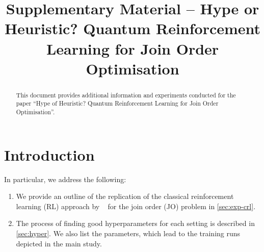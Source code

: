 \documentclass[10pt, conference]{IEEEtran}
\begin{document}
\title{Supplementary Material -- Hype or Heuristic? Quantum Reinforcement Learning for Join Order Optimisation}

\author{
\and
{}
\and
{}
\and
{}
}

\maketitle

\begin{abstract}
  This document provides additional information and experiments conducted for the paper \enquote{Hype of Heuristic? Quantum Reinforcement Learning for Join Order Optimisation}.
\end{abstract}

\section{Introduction}
\label{sec:intro}
In particular, we address the following:
\begin{enumerate}
  \item We provide an outline of the replication of the classical reinforcement learning (RL) approach by \mapa~\cite{marcus18} for the join order (JO) problem in \autoref{sec:exp-crl}.
  \item The process of finding good hyperparameters for each setting is described in \autoref{sec:hyper}. We also list the parameters, which lead to the training runs depicted in the main study.
\end{enumerate}
\end{document}

